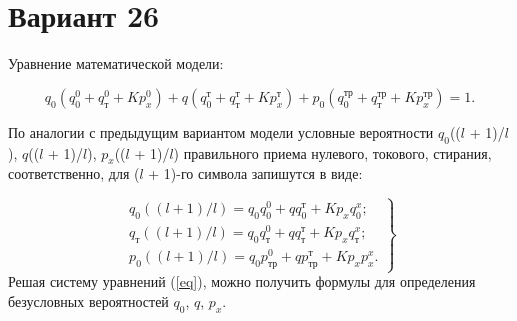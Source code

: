 \documentclass[14pt]{extarticle}
\begin{document}
\section*{Вариант 26}
  Уравнение математической модели:
    
  \begin{equation}
      q_0(q_0^0 + q_\text{т}^0 + K p_x^0) + q(q_0^\text{т} + q_\text{т}^\text{т} + K p_x^\text{т}) + p_0(q_0^\text{тр} + q_\text{т}^\text{тр} + K p_x^\text{тр}) = 1.
  \end{equation}
    
  По аналогии с предыдущим вариантом модели условные вероятности $q_0$(($l$ + 1)/$l$), $q$(($l$ +
  1)/$l$), $p_x$(($l$ + 1)/$l$) правильного приема нулевого, токового, стирания, соответственно, для
  ($l$ + 1)-го символа запишутся в виде:
    
  \begin{equation}\label{eq}
      \left.
        \begin{array}{cc}
          q_0((l + 1)/l) = q_0 q_0^0 + q q_0 ^ \text{т} + K p_x q_0^x; \\
          q_\text{т}((l + 1)/l) = q_0 q_\text{т}^0 + q q_\text{т}^\text{т} + K p_x q_\text{т}^x; \\
          p_0((l + 1)/l) = q_0 p_\text{тр}^0 + q p_\text{тр}^\text{т} + K p_x p_x^x.
        \end{array}
      \right\}
  \end{equation}
  Решая систему уравнений (\ref{eq}), можно получить формулы для определения безусловных вероятностей $q_0$, $q$, $p_x$.
\end{document}
